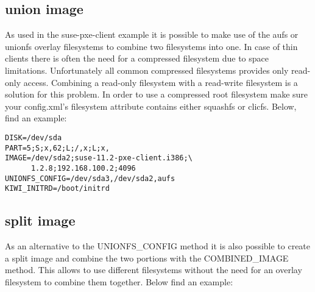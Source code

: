 \subsection{union image}

As used in the suse-pxe-client example it is possible to make use of the
aufs or unionfs overlay filesystems to combine two filesystems
into one. In case of thin clients there is often the need for
a compressed filesystem due to space limitations. Unfortunately
all common compressed filesystems provides only read-only access.
Combining a read-only filesystem with a read-write filesystem
is a solution for this problem. In order to use a compressed
root filesystem make sure your config.xml's filesystem attribute
contains either squashfs or clicfs. Below, find an example:

\begin{Command}{12cm}
\begin{verbatim}
DISK=/dev/sda
PART=5;S;x,62;L;/,x;L;x,
IMAGE=/dev/sda2;suse-11.2-pxe-client.i386;\
      1.2.8;192.168.100.2;4096
UNIONFS_CONFIG=/dev/sda3,/dev/sda2,aufs
KIWI_INITRD=/boot/initrd
\end{verbatim}
\end{Command}

\subsection{split image}

As an alternative to the UNIONFS\_CONFIG method it is also
possible to create a split image and combine the two portions
with the COMBINED\_IMAGE method. This allows to use different
filesystems without the need for an overlay filesystem to combine
them together. Below find an example:


